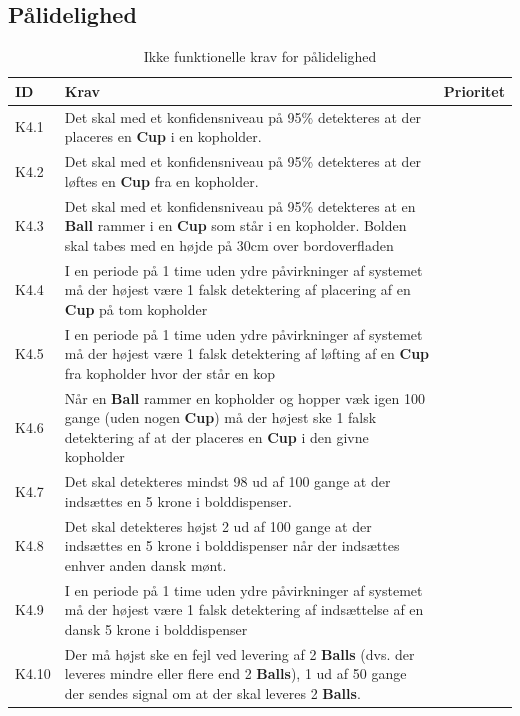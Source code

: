 \documentclass[Kravspecifikation/Kravspec_Main.tex]{subfiles}
\begin{document}
\subsection{Pålidelighed}
\begin{table}[H]
\centering
\begin{tabular}{|L{0.1\textwidth}|L{0.65\textwidth}|L{0.15\textwidth}|}
\hline
\textbf{ID} & \textbf{Krav} & \textbf{Prioritet} \\ \hline
K4.1 & Det skal med et konfidensniveau på 95\% detekteres at der placeres en \textbf{Cup} i en kopholder.  &  \\ \hline
K4.2 & Det skal med et konfidensniveau på 95\% detekteres at der løftes en \textbf{Cup} fra en kopholder.  &  \\ \hline
K4.3 & Det skal med et konfidensniveau på 95\% detekteres at en \textbf{Ball} rammer i  en \textbf{Cup} som står i en kopholder. Bolden skal tabes med en højde på 30cm over bordoverfladen &  \\ \hline
K4.4 & I en periode på 1 time uden ydre påvirkninger af systemet må der højest være 1 falsk detektering af placering af en \textbf{Cup} på tom kopholder &  \\ \hline
K4.5 & I en periode på 1 time uden ydre påvirkninger af systemet må der højest være 1 falsk detektering af løfting af en \textbf{Cup} fra kopholder hvor der står en kop&  \\ \hline
K4.6 & Når en \textbf{Ball} rammer en kopholder og hopper væk igen 100 gange (uden nogen \textbf{Cup}) må der højest ske 1 falsk detektering af at der placeres en \textbf{Cup} i den givne kopholder&  \\ \hline
K4.7 & Det skal detekteres mindst 98 ud af 100 gange at der indsættes en 5 krone i bolddispenser. &  \\ \hline
K4.8 & Det skal detekteres højst 2 ud af 100 gange at der indsættes en 5 krone i bolddispenser når der indsættes enhver anden dansk mønt. &  \\ \hline
K4.9 & I en periode på 1 time uden ydre påvirkninger af systemet må der højest være 1 falsk detektering af indsættelse af en dansk 5 krone i bolddispenser &  \\ \hline
K4.10 & Der må højst ske en fejl ved levering af 2 \textbf{Balls} (dvs. der leveres mindre eller flere end 2 \textbf{Balls}), 1 ud af 50 gange der sendes signal om at der skal leveres 2 \textbf{Balls}.  &  \\ \hline


\end{tabular}
\caption{Ikke funktionelle krav for pålidelighed}
\label{tab:reliability}
\end{table}
\end{document}

